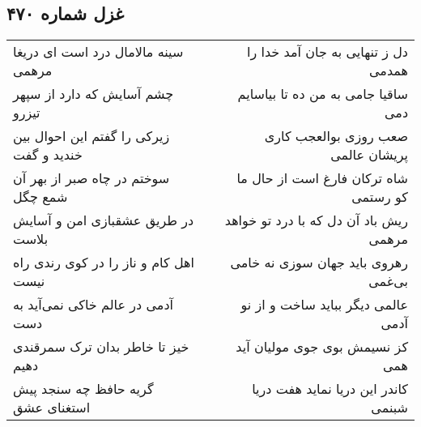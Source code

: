 \begin{center}
\section*{غزل شماره ۴۷۰}
\label{sec:sh470}
\begin{longtable}{l p{0.5cm} r}
سینه مالامال درد است ای دریغا مرهمی
&&
دل ز تنهایی به جان آمد خدا را همدمی
\\
چشم آسایش که دارد از سپهر تیزرو
&&
ساقیا جامی به من ده تا بیاسایم دمی
\\
زیرکی را گفتم این احوال بین خندید و گفت
&&
صعب روزی بوالعجب کاری پریشان عالمی
\\
سوختم در چاه صبر از بهر آن شمع چگل
&&
شاه ترکان فارغ است از حال ما کو رستمی
\\
در طریق عشقبازی امن و آسایش بلاست
&&
ریش باد آن دل که با درد تو خواهد مرهمی
\\
اهل کام و ناز را در کوی رندی راه نیست
&&
رهروی باید جهان سوزی نه خامی بی‌غمی
\\
آدمی در عالم خاکی نمی‌آید به دست
&&
عالمی دیگر بباید ساخت و از نو آدمی
\\
خیز تا خاطر بدان ترک سمرقندی دهیم
&&
کز نسیمش بوی جوی مولیان آید همی
\\
گریه حافظ چه سنجد پیش استغنای عشق
&&
کاندر این دریا نماید هفت دریا شبنمی
\\
\end{longtable}
\end{center}
